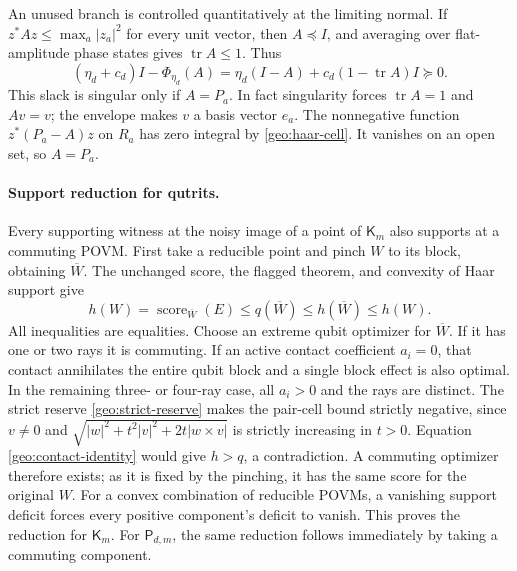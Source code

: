 An unused branch is controlled quantitatively at the limiting
normal. If \(z^*Az\le\max_a|z_a|^2\) for every unit vector, then
\(A\preceq I\), and averaging over flat-amplitude phase states gives
\(\operatorname{tr}A\le1\). Thus
\[
 (\eta_d+c_d)I-\Phi_{\eta_d}(A)
 =\eta_d(I-A)+c_d(1-\operatorname{tr}A)I\succeq0.
\]
This slack is singular only if \(A=P_a\).
In fact singularity forces \(\operatorname{tr}A=1\) and \(Av=v\);
the envelope makes \(v\) a basis vector \(e_a\).
The nonnegative function \(z^*(P_a-A)z\) on \(R_a\) has zero
integral by \eqref{geo:haar-cell}. It vanishes on an open set,
so \(A=P_a\).

\paragraph{Support reduction for qutrits.}
Every supporting witness at the noisy image of a point of
\(\mathsf K_m\) also supports at a commuting POVM.
First take a reducible point and pinch \(W\) to its block,
obtaining \(\overline W\). The unchanged score, the flagged theorem,
and convexity of Haar support give
\[
 h(W)=\operatorname{score}_{\overline W}(E)
 \le q(\overline W)\le h(\overline W)\le h(W).
\]
All inequalities are equalities. Choose an extreme qubit optimizer
for \(\overline W\). If it has one or two rays it is commuting.
If an active contact coefficient \(a_i=0\), that contact annihilates
the entire qubit block and a single block effect is also optimal.
In the remaining three- or four-ray case, all \(a_i>0\) and the rays
are distinct. The strict reserve \eqref{geo:strict-reserve} makes
the pair-cell bound strictly negative, since \(v\ne0\) and
\(\sqrt{|w|^2+t^2|v|^2+2t|w\times v|}\) is strictly increasing in \(t>0\).
Equation \eqref{geo:contact-identity} would give \(h>q\), a contradiction.
A commuting optimizer therefore exists; as it is fixed by the
pinching, it has the same score for the original \(W\).
For a convex combination of reducible POVMs, a vanishing support
deficit forces every positive component's deficit to vanish.
This proves the reduction for \(\mathsf K_m\).
For \(\mathsf P_{d,m}\), the same reduction follows immediately
by taking a commuting component.

